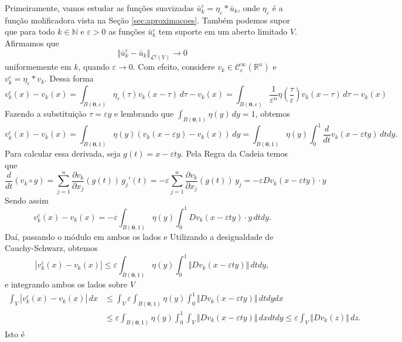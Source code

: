 \documentclass[a4paper, 11pt]{book}
\theoremstyle{definition}
\newcommand{\bN}{\mathbb{N}}
\newcommand{\bR}{\mathbb{R}}
\newcommand{\bz}{\mathbf{0}}
\newcommand{\cC}{\mathcal{C}}
\newcommand{\cL}{\mathcal{L}}
\begin{document}
\begin{prf}
    Primeiramente, vamos estudar as funções suavizadas $\bar u_k^\varepsilon = \eta_\varepsilon * \bar u_k$, onde $\eta_\varepsilon$ é a função molificadora vista na Seção \ref{sec:aproximacoes}.
    Também podemos supor que para todo $k \in \bN$ e $\varepsilon > 0$ as funções $\bar u_k^\varepsilon$ tem suporte em um aberto limitado $V$.
    Afirmamos que
    \[
        \Vert \bar u_k^\varepsilon - \bar u_k \Vert_{\cL^q(V)} \to 0
    \]
    uniformemente em $k$, quando $\varepsilon \to 0$.
    Com efeito, considere $v_k \in \cC^{\infty}_c(\bR^n)$ e $v_k^\varepsilon = \eta_\varepsilon * v_k$.
    Dessa forma
    \[
        v_k^\varepsilon(x) - v_k(x) = \int_{B(\bz,\varepsilon)} \eta_\varepsilon(\tau) v_k (x - \tau) \,d\tau - v_k(x)  = \int_{B(\bz,\varepsilon)} \frac{1}{\varepsilon^n} \eta \left( \frac{\tau}{\varepsilon} \right) v_k (x - \tau) \,d\tau - v_k(x)
    \]
    Fazendo a substituição $\tau = \varepsilon y$ e lembrando que $\int_{B(\bz,1)} \eta(y) \,dy = 1$, obtemos
    \[
        v_k^\varepsilon(x) - v_k(x) = \int_{B(\bz,1)} \eta(y) \left( v_k(x - \varepsilon y) - v_k(x) \right) \,dy = \int_{B(\bz,1)} \eta(y) \int_0^1 \frac{d}{dt}v_k(x - \varepsilon t y) \,dt dy.
    \]
    Para calcular essa derivada, seja $g(t) = x - \varepsilon t y$. Pela Regra da Cadeia temos que
    \[
        \frac{d}{dt} (v_k \circ g) = \sum_{j=1}^n \dfrac{\partial v_k}{\partial x_j} (g(t)) \, g_j'(t) = -\varepsilon\sum_{j=1}^{n} \dfrac{\partial v_k}{\partial x_j}(g(t)) \,y_j = -\varepsilon Dv_k(x - \varepsilon ty) \cdot y
    \]
    Sendo assim
    \[
        v_k^\varepsilon(x) - v_k(x) = -\varepsilon \int_{B(\bz,1)} \eta(y) \int_0^1 Dv_k(x - \varepsilon ty) \cdot y \,dtdy.
    \]
    Daí, passando o módulo em ambos os lados e Utilizando a desigualdade de Cauchy-Schwarz, obtemos
    \[
        |v_k^\varepsilon(x) - v_k(x)| \leqslant \varepsilon \int_{B(\bz,1)} \eta(y) \int_0^1 \Vert Dv_k(x - \varepsilon ty) \Vert \,dtdy,
    \]
    e integrando ambos os lados sobre $V$
    \[
        \begin{aligned}
            \int_{V} |v_k^\varepsilon(x) - v_k(x)|\,dx &\leqslant \int_{V} \varepsilon \int_{B(\bz,1)} \eta(y) \int_0^1 \Vert Dv_k(x - \varepsilon ty) \Vert \,dtdydx\\
            &\leqslant \varepsilon \int_{B(\bz,1)} \eta(y) \int_0^1 \int_{V} \Vert Dv_k(x - \varepsilon ty) \Vert \,dxdtdy \leqslant \varepsilon \int_{V} \Vert Dv_k(z) \Vert    \,dz.
        \end{aligned}
    \]
    Isto é
    \begin{equation} \label{eq:vekvek}

\end{equation}
\end{prf}
\end{document}
